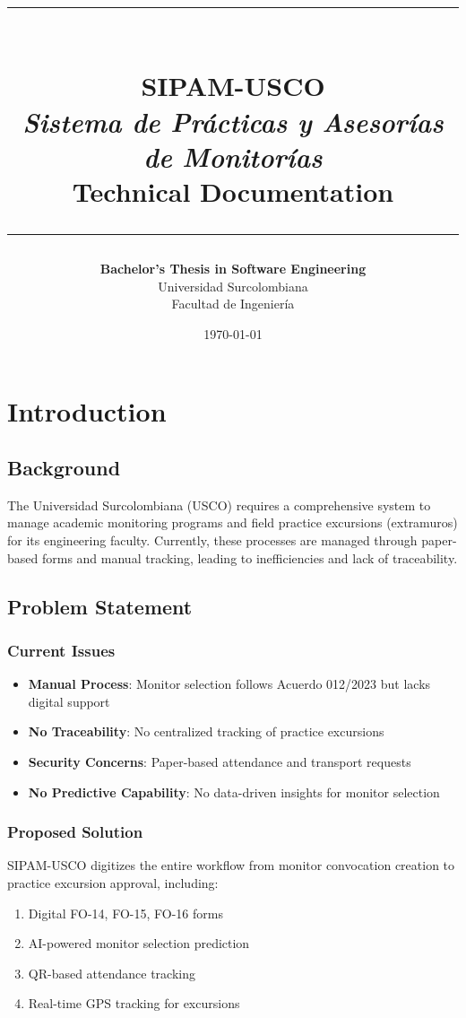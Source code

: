 \documentclass[12pt,a4paper]{report}
\title{
    \vspace{-1cm}
    \textcolor{uscoRed}{\rule{\textwidth}{2pt}}\\[0.5cm]
    \textbf{\Huge SIPAM-USCO}\\[0.3cm]
    \Large \textit{Sistema de Prácticas y Asesorías de Monitorías}\\[0.3cm]
    \LARGE Technical Documentation\\[0.5cm]
    \textcolor{uscoRed}{\rule{\textwidth}{2pt}}
}
\author{
    \textbf{Bachelor's Thesis in Software Engineering}\\[0.3cm]
    Universidad Surcolombiana\\
    Facultad de Ingeniería
}
\date{\today}
\begin{document}
\maketitle

\tableofcontents
\listoftables
\listoffigures

\chapter{Introduction}

\section{Background}

The Universidad Surcolombiana (USCO) requires a comprehensive system to manage academic monitoring programs and field practice excursions (extramuros) for its engineering faculty. Currently, these processes are managed through paper-based forms and manual tracking, leading to inefficiencies and lack of traceability.

\section{Problem Statement}

\subsection{Current Issues}
\begin{itemize}
    \item \textbf{Manual Process}: Monitor selection follows Acuerdo 012/2023 but lacks digital support
    \item \textbf{No Traceability}: No centralized tracking of practice excursions
    \item \textbf{Security Concerns}: Paper-based attendance and transport requests
    \item \textbf{No Predictive Capability}: No data-driven insights for monitor selection
\end{itemize}

\subsection{Proposed Solution}
SIPAM-USCO digitizes the entire workflow from monitor convocation creation to practice excursion approval, including:
\begin{enumerate}
    \item Digital FO-14, FO-15, FO-16 forms
    \item AI-powered monitor selection prediction
    \item QR-based attendance tracking
    \item Real-time GPS tracking for excursions
\end{enumerate}
\end{document}
